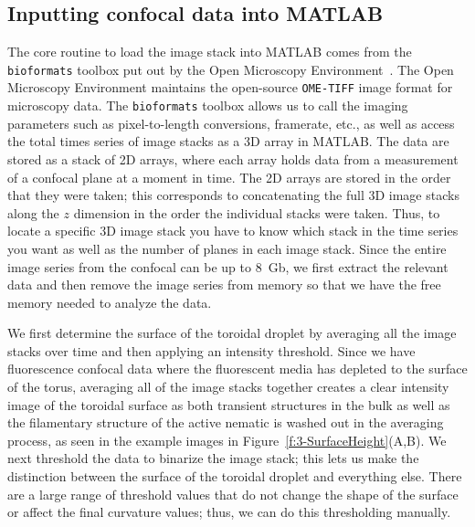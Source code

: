 \subsection{Inputting confocal data into MATLAB}
The core routine to load the image stack into MATLAB comes from the \texttt{bioformats} toolbox put out by the Open Microscopy Environment~\cite{RN265}.
The Open Microscopy Environment maintains the open-source \texttt{OME-TIFF} image format for microscopy data.
The \texttt{bioformats} toolbox allows us to call the imaging parameters such as pixel-to-length conversions, framerate, etc., as well as access the total times series of image stacks as a 3D array in MATLAB.
The data are stored as a stack of 2D arrays, where each array holds data from a measurement of a confocal plane at a moment in time.
The 2D arrays are stored in the order that they were taken; this corresponds to concatenating the full 3D image stacks along the $z$ dimension in the order the individual stacks were taken.
Thus, to locate a specific 3D image stack you have to know which stack in the time series you want as well as the number of planes in each image stack.
Since the entire image series from the confocal can be up to 8~Gb, we first extract the relevant data and then remove the image series from memory so that we have the free memory needed to analyze the data.

We first determine the surface of the toroidal droplet by averaging all the image stacks over time and then applying an intensity threshold.
Since we have fluorescence confocal data where the fluorescent media has depleted to the surface of the torus, averaging all of the image stacks together creates a clear intensity image of the toroidal surface as both transient structures in the bulk as well as the filamentary structure of the active nematic is washed out in the averaging process, as seen in the example images in Figure~\ref{f:3-SurfaceHeight}(A,B).
We next threshold the data to binarize the image stack; this lets us make the distinction between the surface of the toroidal droplet and everything else.
There are a large range of threshold values that do not change the shape of the surface or affect the final curvature values; thus, we can do this thresholding manually.

